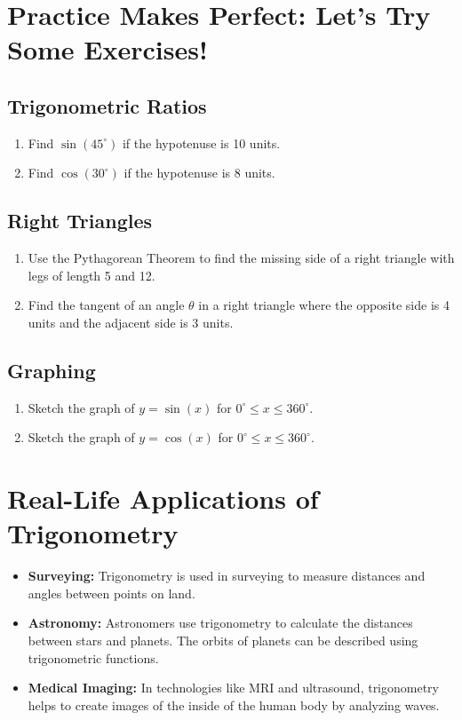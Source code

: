 \section{Practice Makes Perfect: Let’s Try Some Exercises!}
\subsection{Trigonometric Ratios}
\begin{enumerate}
    \item Find $\sin(45^\circ)$ if the hypotenuse is 10 units.
    \item Find $\cos(30^\circ)$ if the hypotenuse is 8 units.
\end{enumerate}

\subsection{Right Triangles}
\begin{enumerate}
    \item Use the Pythagorean Theorem to find the missing side of a right triangle with legs of length 5 and 12.
    \item Find the tangent of an angle $\theta$ in a right triangle where the opposite side is 4 units and the adjacent side is 3 units.
\end{enumerate}

\subsection{Graphing}
\begin{enumerate}
    \item Sketch the graph of $y = \sin(x)$ for $0^\circ \leq x \leq 360^\circ$.
    \item Sketch the graph of $y = \cos(x)$ for $0^\circ \leq x \leq 360^\circ$.
\end{enumerate}

\section{Real-Life Applications of Trigonometry}
\begin{itemize}
    \item \textbf{Surveying:} Trigonometry is used in surveying to measure distances and angles between points on land.
    \item \textbf{Astronomy:} Astronomers use trigonometry to calculate the distances between stars and planets. The orbits of planets can be described using trigonometric functions.
    \item \textbf{Medical Imaging:} In technologies like MRI and ultrasound, trigonometry helps to create images of the inside of the human body by analyzing waves.
\end{itemize}

